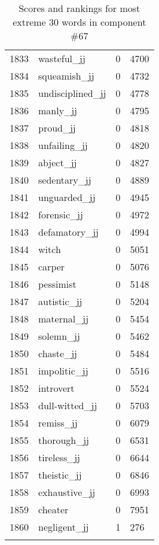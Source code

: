 \begin{longtable}[!htbp]{| rlr@{.}l |}
    1833 & wasteful\_jj & 0 & 4700 \\
    1834 & squeamish\_jj & 0 & 4732 \\
    1835 & undisciplined\_jj & 0 & 4778 \\
    1836 & manly\_jj & 0 & 4795 \\
    1837 & proud\_jj & 0 & 4818 \\
    1838 & unfailing\_jj & 0 & 4820 \\
    1839 & abject\_jj & 0 & 4827 \\
    1840 & sedentary\_jj & 0 & 4889 \\
    1841 & unguarded\_jj & 0 & 4945 \\
    1842 & forensic\_jj & 0 & 4972 \\
    1843 & defamatory\_jj & 0 & 4994 \\
    1844 & witch & 0 & 5051 \\
    1845 & carper & 0 & 5076 \\
    1846 & pessimist & 0 & 5148 \\
    1847 & autistic\_jj & 0 & 5204 \\
    1848 & maternal\_jj & 0 & 5454 \\
    1849 & solemn\_jj & 0 & 5462 \\
    1850 & chaste\_jj & 0 & 5484 \\
    1851 & impolitic\_jj & 0 & 5516 \\
    1852 & introvert & 0 & 5524 \\
    1853 & dull-witted\_jj & 0 & 5703 \\
    1854 & remiss\_jj & 0 & 6079 \\
    1855 & thorough\_jj & 0 & 6531 \\
    1856 & tireless\_jj & 0 & 6644 \\
    1857 & theistic\_jj & 0 & 6846 \\
    1858 & exhaustive\_jj & 0 & 6993 \\
    1859 & cheater & 0 & 7951 \\
    1860 & negligent\_jj & 1 & 276 \\
    \hline
    \caption{Scores and rankings for most extreme 30 words in component \#67} \\
\end{longtable}
